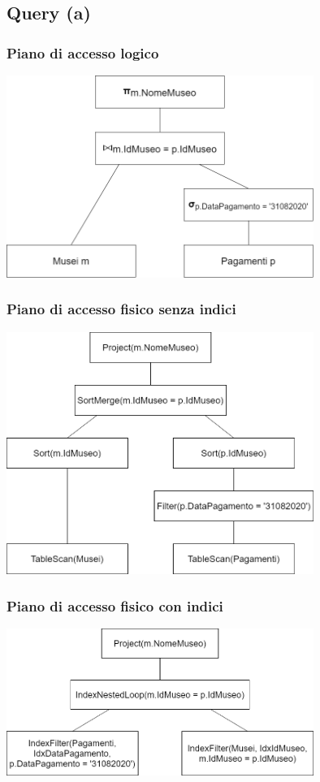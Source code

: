 \documentclass[a4paper, 12pt]{article}
\begin{document}
\subsection{Query (a)} 
\subsubsection{Piano di accesso logico}
\begin{center}
    \includegraphics[width=10cm]{pianoLogicoQueryA.png}
\end{center}
\subsubsection{Piano di accesso fisico senza indici}
\begin{center}
    \includegraphics[width=10cm]{pianoFisicoQueryA.png}
\end{center}
\subsubsection{Piano di accesso fisico con indici}
\begin{center}
    \includegraphics[width=10cm]{pianoIdxQueryA.png}
\end{center}
\end{document}
